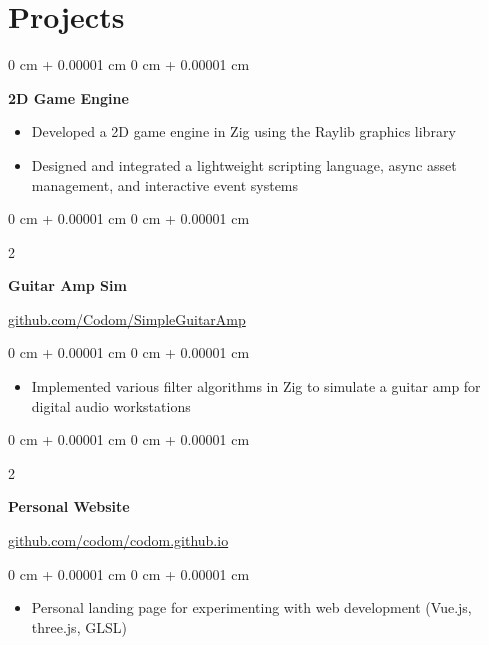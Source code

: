 \documentclass[10pt, letterpaper]{article}
\newenvironment{onecolentry}{
    \begin{adjustwidth}{
        0 cm + 0.00001 cm
    }{
        0 cm + 0.00001 cm
    }
}{
    \end{adjustwidth}
} %
\newenvironment{twocolentry}[2][]{
    \onecolentry
    \def\secondColumn{#2}
    \setcolumnwidth{\fill, 6.0 cm}
    \begin{paracol}{2}
}{
    \switchcolumn \raggedleft \secondColumn
    \end{paracol}
    \endonecolentry
} %
\begin{document}
    \section{Projects}

        \begin{onecolentry}
            \textbf{2D Game Engine}
            \begin{itemize}
              \item Developed a 2D game engine in Zig using the Raylib graphics library
              \item Designed and integrated a lightweight scripting language, async asset management, and interactive event systems
            \end{itemize}
        \end{onecolentry}

        \vspace{0.2 cm}
        \begin{twocolentry}{
            \href{https://github.com/Codom/SimpleGuitarAmp}{github.com/Codom/SimpleGuitarAmp}
        }
        \textbf{Guitar Amp Sim}
        \end{twocolentry}

        \vspace{0.10 cm}
        \begin{onecolentry}
          \begin{itemize}
                \item Implemented various filter algorithms in Zig to simulate a guitar amp for digital audio workstations
              \end{itemize}
        \end{onecolentry}

        \vspace{0.2 cm}

        \begin{twocolentry}{
            \href{https://github.com/codom/codom.github.io}{github.com/codom/codom.github.io}
        }

        \textbf{Personal Website}
        \end{twocolentry}

        \vspace{0.10 cm}
        \begin{onecolentry}
          \begin{itemize}
              \item Personal landing page for experimenting with web development (Vue.js, three.js, GLSL)
            \end{itemize}
        \end{onecolentry}
\end{document}
